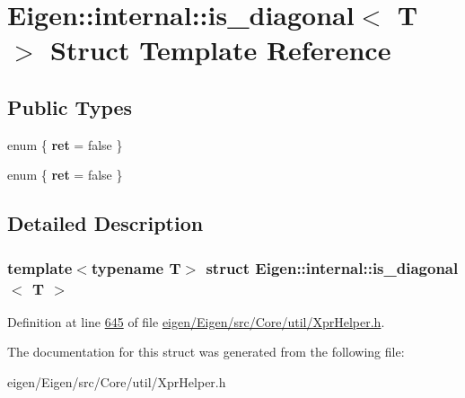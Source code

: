 \hypertarget{struct_eigen_1_1internal_1_1is__diagonal}{}\section{Eigen\+:\+:internal\+:\+:is\+\_\+diagonal$<$ T $>$ Struct Template Reference}
\label{struct_eigen_1_1internal_1_1is__diagonal}
\subsection*{Public Types}
\begin{DoxyCompactItemize}
\item 
\mbox{\label{struct_eigen_1_1internal_1_1is__diagonal_a047dfc2b93cbbdaaba74ff112af16e59}} 
enum \{ {\bfseries ret} = false
 \}
\item 
\mbox{\label{struct_eigen_1_1internal_1_1is__diagonal_a663c43daf7f24be1689d67d6fe3a4f8c}} 
enum \{ {\bfseries ret} = false
 \}
\end{DoxyCompactItemize}


\subsection{Detailed Description}
\subsubsection*{template$<$typename T$>$\newline
struct Eigen\+::internal\+::is\+\_\+diagonal$<$ T $>$}



Definition at line \hyperlink{eigen_2_eigen_2src_2_core_2util_2_xpr_helper_8h_source_l00645}{645} of file \hyperlink{eigen_2_eigen_2src_2_core_2util_2_xpr_helper_8h_source}{eigen/\+Eigen/src/\+Core/util/\+Xpr\+Helper.\+h}.



The documentation for this struct was generated from the following file\+:\begin{DoxyCompactItemize}
\item 
eigen/\+Eigen/src/\+Core/util/\+Xpr\+Helper.\+h\end{DoxyCompactItemize}
